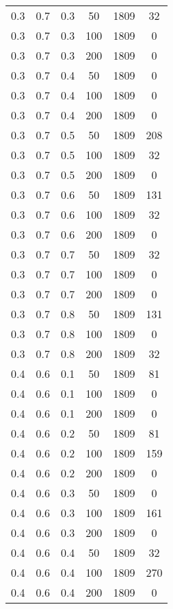 \begin{center}
\begin{longtable}[c]{|c|c|c|c|c|c|}
		0.3 &  0.7 &  0.3 &   50 &  1809 &    32 \\
		0.3 &  0.7 &  0.3 &  100 &  1809 &     0 \\
		0.3 &  0.7 &  0.3 &  200 &  1809 &     0 \\
	   \hline
		0.3 &  0.7 &  0.4 &   50 &  1809 &     0 \\
		0.3 &  0.7 &  0.4 &  100 &  1809 &     0 \\
		0.3 &  0.7 &  0.4 &  200 &  1809 &     0 \\
	   \hline
		0.3 &  0.7 &  0.5 &   50 &  1809 &   208 \\
		0.3 &  0.7 &  0.5 &  100 &  1809 &    32 \\
		0.3 &  0.7 &  0.5 &  200 &  1809 &     0 \\
	   \hline
		0.3 &  0.7 &  0.6 &   50 &  1809 &   131 \\
		0.3 &  0.7 &  0.6 &  100 &  1809 &    32 \\
		0.3 &  0.7 &  0.6 &  200 &  1809 &     0 \\
	   \hline
		0.3 &  0.7 &  0.7 &   50 &  1809 &    32 \\
		0.3 &  0.7 &  0.7 &  100 &  1809 &     0 \\
		0.3 &  0.7 &  0.7 &  200 &  1809 &     0 \\
	   \hline
		0.3 &  0.7 &  0.8 &   50 &  1809 &   131 \\
		0.3 &  0.7 &  0.8 &  100 &  1809 &     0 \\
		0.3 &  0.7 &  0.8 &  200 &  1809 &    32 \\
	   \hline
		0.4 &  0.6 &  0.1 &   50 &  1809 &    81 \\
		0.4 &  0.6 &  0.1 &  100 &  1809 &     0 \\
		0.4 &  0.6 &  0.1 &  200 &  1809 &     0 \\
	   \hline
		0.4 &  0.6 &  0.2 &   50 &  1809 &    81 \\
		0.4 &  0.6 &  0.2 &  100 &  1809 &   159 \\
		0.4 &  0.6 &  0.2 &  200 &  1809 &     0 \\
	   \hline
		0.4 &  0.6 &  0.3 &   50 &  1809 &     0 \\
		0.4 &  0.6 &  0.3 &  100 &  1809 &   161 \\
		0.4 &  0.6 &  0.3 &  200 &  1809 &     0 \\
	   \hline
		0.4 &  0.6 &  0.4 &   50 &  1809 &    32 \\
		0.4 &  0.6 &  0.4 &  100 &  1809 &   270 \\
		0.4 &  0.6 &  0.4 &  200 &  1809 &     0 \\

\end{longtable}
\end{center}
